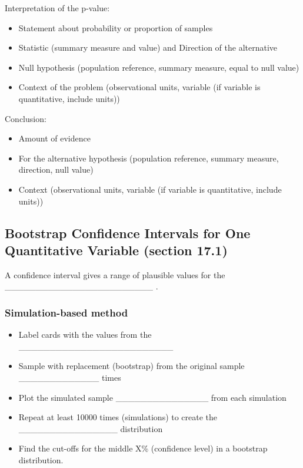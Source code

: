 \documentclass[
]{report}
\begin{document}
Interpretation of the p-value:

\begin{itemize}
\item
  Statement about probability or proportion of samples
\item
  Statistic (summary measure and value) and Direction of the alternative
\item
  Null hypothesis (population reference, summary measure, equal to null value)
\item
  Context of the problem (observational units, variable (if variable is quantitative, include units))
\end{itemize}

\vspace{0.8in}

\newpage

Conclusion:

\begin{itemize}
\item
  Amount of evidence
\item
  For the alternative hypothesis (population reference, summary measure, direction, null value)
\item
  Context (observational units, variable (if variable is quantitative, include units))
\end{itemize}

\vspace{0.8in}

\subsection*{Bootstrap Confidence Intervals for One Quantitative Variable (section 17.1)}\label{bootstrap-confidence-intervals-for-one-quantitative-variable-section-17.1}

A confidence interval gives a range of plausible values for the \_\_\_\_\_\_\_\_\_\_\_\_\_\_\_\_\_\_\_\_\_\_\_\_ .

\subsubsection*{Simulation-based method}\label{simulation-based-method-3}

\begin{itemize}
\item
  Label cards with the values from the \_\_\_\_\_\_\_\_\_\_\_\_\_\_\_\_\_\_\_\_\_\_\_\_\_
\item
  Sample with replacement (bootstrap) from the original sample \_\_\_\_\_\_\_\_\_\_\_\_\_ times
\item
  Plot the simulated sample \_\_\_\_\_\_\_\_\_\_\_\_\_\_\_ from each simulation
\item
  Repeat at least 10000 times (simulations) to create the \_\_\_\_\_\_\_\_\_\_\_\_\_\_\_\_ distribution
\item
  Find the cut-offs for the middle X\% (confidence level) in a bootstrap distribution.
\end{itemize}
\end{document}
